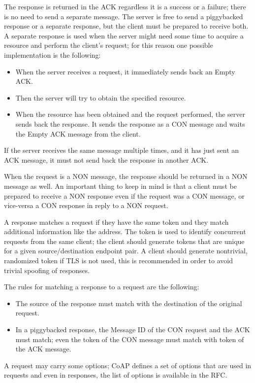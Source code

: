 	The response is returned in the ACK regardless it is a success or a failure; there is no need to send a separate message.\newline
	The server is free to send a piggybacked response or a separate response, but the client must be prepared to receive both.\newline
	A separate response is used when the server might need some time to acquire a resource and perform the client’s request; for this reason one possible implementation is the following:
	\begin{itemize}
		\item When the server receives a request, it immediately sends back an Empty ACK.
		\item Then the server will try to obtain the specified resource.
		\item When the resource has been obtained and the request performed, the server sends back the response.
		It sends the response as a CON message and waits the Empty ACK message from the client.
	\end{itemize}
	If the server receives the same message multiple times, and it has just sent an ACK message, it must not send back the response in another ACK.\newline
	
	When the request is a NON message, the response should be returned in a NON message as well.\newline
	An important thing to keep in mind is that a client must be prepared to receive a NON response even if the request was a CON message, or vice-versa a CON response in reply to a NON request.\newline
	
	A response matches a request if they have the same token and they match additional information like the address.\newline
	The token is used to identify concurrent requests from the same client; the client should generate tokens that are unique for a given source/destination endpoint pair.\newline
	A client should generate nontrivial, randomized token if TLS is not used, this is recommended in order to avoid trivial spoofing of responses.\newline
	
	The rules for matching a response to a request are the following:
	\begin{itemize}
		\item The source of the response must match with the destination of the original request.
		\item In a piggybacked response, the Message ID of the CON request and the ACK must match; even the token of the CON message must match with token of the ACK message.
	\end{itemize}
	A request may carry some options; CoAP defines a set of options that are used in requests and even in responses,
	the list of options is available in the RFC.
	
